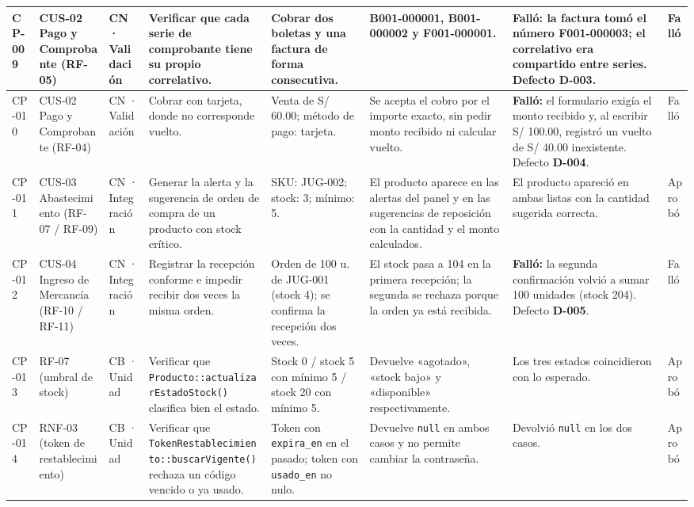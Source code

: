 \begin{landscape}
\begin{xltabular}{\linewidth}{|C{1.15cm}|L{2.35cm}|C{1.65cm}|L{3.55cm}|L{3.0cm}|Y|Y|C{1.3cm}|}
  CP-009 & CUS-02 Pago y Comprobante (RF-05) & CN · Validación & Verificar que cada serie de comprobante tiene su propio correlativo. & Cobrar dos boletas y una factura de forma consecutiva. & B001-000001, B001-000002 y F001-000001. & \textbf{Falló:} la factura tomó el número F001-000003; el correlativo era compartido entre series. Defecto \textbf{D-003}. & Falló \\ \hline

  CP-010 & CUS-02 Pago y Comprobante (RF-04) & CN · Validación & Cobrar con tarjeta, donde no corresponde vuelto. & Venta de S/ 60.00; método de pago: tarjeta. & Se acepta el cobro por el importe exacto, sin pedir monto recibido ni calcular vuelto. & \textbf{Falló:} el formulario exigía el monto recibido y, al escribir S/ 100.00, registró un vuelto de S/ 40.00 inexistente. Defecto \textbf{D-004}. & Falló \\ \hline

  CP-011 & CUS-03 Abastecimiento (RF-07 / RF-09) & CN · Integración & Generar la alerta y la sugerencia de orden de compra de un producto con stock crítico. & SKU: JUG-002; stock: 3; mínimo: 5. & El producto aparece en las alertas del panel y en las sugerencias de reposición con la cantidad y el monto calculados. & El producto apareció en ambas listas con la cantidad sugerida correcta. & Aprobó \\ \hline

  CP-012 & CUS-04 Ingreso de Mercancía (RF-10 / RF-11) & CN · Integración & Registrar la recepción conforme e impedir recibir dos veces la misma orden. & Orden de 100 u. de JUG-001 (stock 4); se confirma la recepción dos veces. & El stock pasa a 104 en la primera recepción; la segunda se rechaza porque la orden ya está recibida. & \textbf{Falló:} la segunda confirmación volvió a sumar 100 unidades (stock 204). Defecto \textbf{D-005}. & Falló \\ \hline

  CP-013 & RF-07 (umbral de stock) & CB · Unidad & Verificar que \texttt{Producto::\allowbreak actualizarEstadoStock()} clasifica bien el estado. & Stock 0 / stock 5 con mínimo 5 / stock 20 con mínimo 5. & Devuelve «agotado», «stock bajo» y «disponible» respectivamente. & Los tres estados coincidieron con lo esperado. & Aprobó \\ \hline

  CP-014 & RNF-03 (token de restablecimiento) & CB · Unidad & Verificar que \texttt{TokenRestablecimiento::\allowbreak buscarVigente()} rechaza un código vencido o ya usado. & Token con \texttt{expira\_en} en el pasado; token con \texttt{usado\_en} no nulo. & Devuelve \texttt{null} en ambos casos y no permite cambiar la contraseña. & Devolvió \texttt{null} en los dos casos. & Aprobó \\ \hline


\end{xltabular}
\end{landscape}
